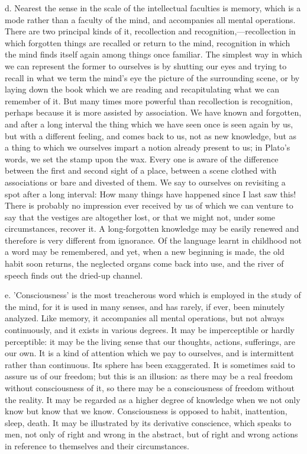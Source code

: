 \documentclass[11pt,letter]{article}
\begin{document}
\par  d. Nearest the sense in the scale of the intellectual faculties is memory, which is a mode rather than a faculty of the mind, and accompanies all mental operations. There are two principal kinds of it, recollection and recognition,—recollection in which forgotten things are recalled or return to the mind, recognition in which the mind finds itself again among things once familiar. The simplest way in which we can represent the former to ourselves is by shutting our eyes and trying to recall in what we term the mind's eye the picture of the surrounding scene, or by laying down the book which we are reading and recapitulating what we can remember of it. But many times more powerful than recollection is recognition, perhaps because it is more assisted by association. We have known and forgotten, and after a long interval the thing which we have seen once is seen again by us, but with a different feeling, and comes back to us, not as new knowledge, but as a thing to which we ourselves impart a notion already present to us; in Plato's words, we set the stamp upon the wax. Every one is aware of the difference between the first and second sight of a place, between a scene clothed with associations or bare and divested of them. We say to ourselves on revisiting a spot after a long interval: How many things have happened since I last saw this! There is probably no impression ever received by us of which we can venture to say that the vestiges are altogether lost, or that we might not, under some circumstances, recover it. A long-forgotten knowledge may be easily renewed and therefore is very different from ignorance. Of the language learnt in childhood not a word may be remembered, and yet, when a new beginning is made, the old habit soon returns, the neglected organs come back into use, and the river of speech finds out the dried-up channel.

\par  e. 'Consciousness' is the most treacherous word which is employed in the study of the mind, for it is used in many senses, and has rarely, if ever, been minutely analyzed. Like memory, it accompanies all mental operations, but not always continuously, and it exists in various degrees. It may be imperceptible or hardly perceptible: it may be the living sense that our thoughts, actions, sufferings, are our own. It is a kind of attention which we pay to ourselves, and is intermittent rather than continuous. Its sphere has been exaggerated. It is sometimes said to assure us of our freedom; but this is an illusion: as there may be a real freedom without consciousness of it, so there may be a consciousness of freedom without the reality. It may be regarded as a higher degree of knowledge when we not only know but know that we know. Consciousness is opposed to habit, inattention, sleep, death. It may be illustrated by its derivative conscience, which speaks to men, not only of right and wrong in the abstract, but of right and wrong actions in reference to themselves and their circumstances.
\end{document}
